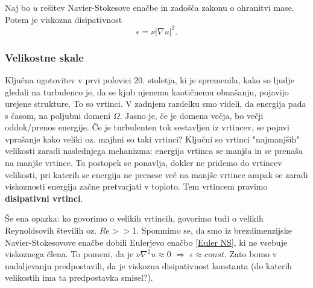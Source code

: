 \documentclass[mat2, tisk]{fmfdelo}
\begin{document}
\begin{definicija}
Naj bo $u$ rešitev Navier-Stokesove enačbe in zadošča zakonu o ohranitvi mase. Potem je 
viskozna disipativnost
\begin{equation}
\epsilon = \nu|\nabla u|^2.
\end{equation}
\end{definicija}

\subsubsection{Velikostne skale}
Ključna ugotovitev v prvi polovici 20. stoletja, ki je spremenila, kako so ljudje gledali 
na turbulenco je, da se kjub njenemu kaotičnemu obnašanju, pojavijo urejene strukture. To 
so vrtinci. V zadnjem razdelku smo videli, da energija pada s časom, na poljubni domeni 
$\Omega$. Jasno je, če je domena večja, bo večji oddok/prenos energije. Če je turbulenten 
tok sestavljen iz vrtincev, se pojavi vprašanje kako veliki oz. majhni so taki vrtinci? 
Ključni so vrtinci "najmanjših" velikosti zaradi naslednjega mehanizma:
energija vrtinca se manjša in se prenaša na manjše vrtince. Ta postopek se ponavlja, dokler 
ne pridemo do vrtincev velikosti, pri katerih se energija ne prenese več na manjše vrtince 
ampak se zaradi viskoznosti energija začne pretvarjati v toploto. Tem vrtincem pravimo
\textbf{disipativni vrtinci}.

Še ena opazka: ko govorimo o velikih vrtincih, govorimo tudi o velikih Reynoldsovih 
številih oz. $Re >> 1$. Spomnimo se, da smo iz brezdimenzijske Navier-Stokesovove enačbe 
dobili Eulerjevo enačbo \ref{Euler NS}, ki ne vsebuje viskoznega člena. To pomeni, da je 
$\nu \nabla^2 u \approx 0$ $\Longrightarrow$ $\epsilon \approx const.$ Zato bomo v 
nadaljevanju predpostavili, da je viskozna disipativnost konstanta (do katerih velikostih 
ima ta predpostavka smisel?).\\
\end{document}
